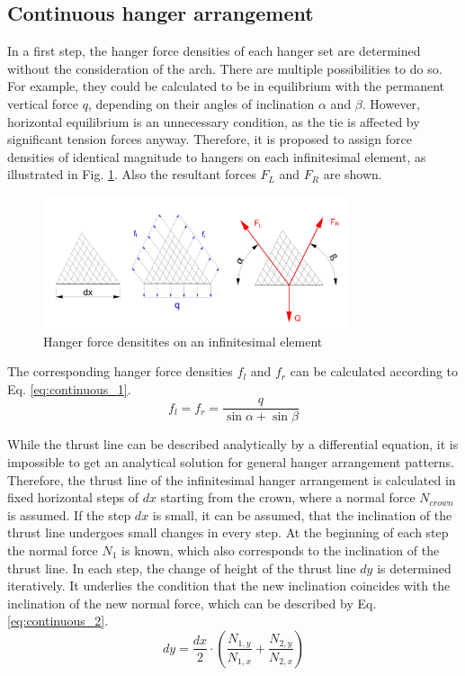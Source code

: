 \subsection{Continuous hanger arrangement}\label{app:continuous}
In a first step, the hanger force densities of each hanger set are determined without the consideration of the arch. There are multiple possibilities to do so. For example, they could be calculated to be in equilibrium with the permanent vertical force $q$, depending on their angles of inclination $\alpha$ and $\beta$. However, horizontal equilibrium is an unnecessary condition, as the tie is affected by significant tension forces anyway. Therefore, it is proposed to assign force densities of identical magnitude to hangers on each infinitesimal element, as illustrated in Fig. \ref{fig:continuous_1}. Also the resultant forces $F_L$ and $F_R$ are shown.
\begin{figure}[H]
    \centering
    \includegraphics[width=0.8\textwidth]{overleaf/Appendix/Pictures/continuous_thrust_line_1.PNG}
    \caption{Hanger force densitites on an infinitesimal element}
    \label{fig:continuous_1}
\end{figure}

The corresponding hanger force densities $f_l$ and $f_r$ can be calculated according to Eq. \eqref{eq:continuous_1}.
\begin{equation}
    f_l=f_r=\frac{q}{\sin{\alpha}+ \sin{\beta}}
    \label{eq:continuous_1}
\end{equation}

While the thrust line can be described analytically by a differential equation, it is impossible to get an analytical solution for general hanger arrangement patterns. Therefore, the thrust line of the infinitesimal hanger arrangement is calculated in fixed horizontal steps of $dx$ starting from the crown, where a normal force $N_{crown}$ is assumed. If the step $dx$ is small, it can be assumed, that the inclination of the thrust line undergoes small changes in every step. At the beginning of each step the normal force $N_1$ is known, which also corresponds to the inclination of the thrust line. In each step, the change of height of the thrust line $dy$ is determined iteratively. It underlies the condition that the new inclination coincides with the inclination of the new normal force, which can be described by Eq. \ref{eq:continuous_2}.
\begin{equation}
    dy = \frac{dx}{2} \cdot \left(\frac{N_{1,y}}{N_{1,x}} + \frac{N_{2,y}}{N_{2,x}} \right)
    \label{eq:continuous_2}
\end{equation}

